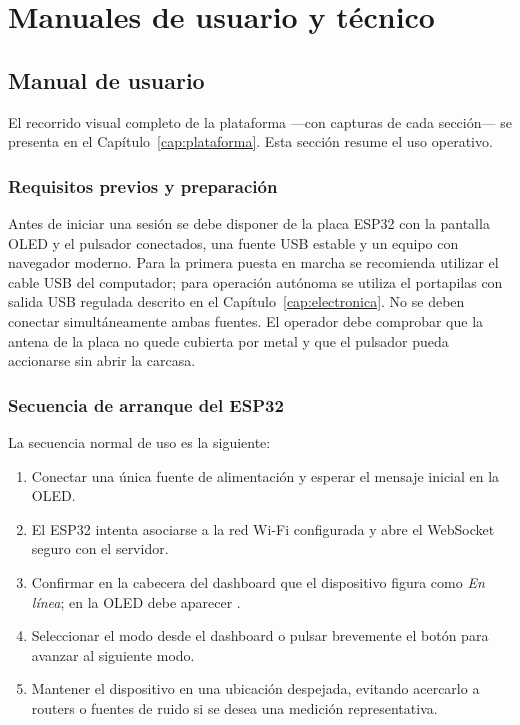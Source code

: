 \chapter{Manuales de usuario y técnico}
\label{cap:manuales}

\section{Manual de usuario}
El recorrido visual completo de la plataforma ---con capturas de cada sección--- se
presenta en el Capítulo~\ref{cap:plataforma}. Esta sección resume el uso operativo.

\subsection{Requisitos previos y preparación}
Antes de iniciar una sesión se debe disponer de la placa ESP32 con la pantalla OLED
y el pulsador conectados, una fuente USB estable y un equipo con navegador moderno.
Para la primera puesta en marcha se recomienda utilizar el cable USB del computador;
para operación autónoma se utiliza el portapilas con salida USB regulada descrito en
el Capítulo~\ref{cap:electronica}. No se deben conectar simultáneamente ambas fuentes.
El operador debe comprobar que la antena de la placa no quede cubierta por metal y
que el pulsador pueda accionarse sin abrir la carcasa.

\subsection{Secuencia de arranque del ESP32}
La secuencia normal de uso es la siguiente:
\begin{enumerate}[leftmargin=1.8em]
  \item Conectar una única fuente de alimentación y esperar el mensaje inicial en la OLED.
  \item El ESP32 intenta asociarse a la red Wi\nobreakdash-Fi configurada y abre el WebSocket seguro con el servidor.
  \item Confirmar en la cabecera del dashboard que el dispositivo figura como \emph{En línea}; en la OLED debe aparecer \code{[WS:OK]}.
  \item Seleccionar el modo desde el dashboard o pulsar brevemente el botón para avanzar al siguiente modo.
  \item Mantener el dispositivo en una ubicación despejada, evitando acercarlo a routers o fuentes de ruido si se desea una medición representativa.
\end{enumerate}

